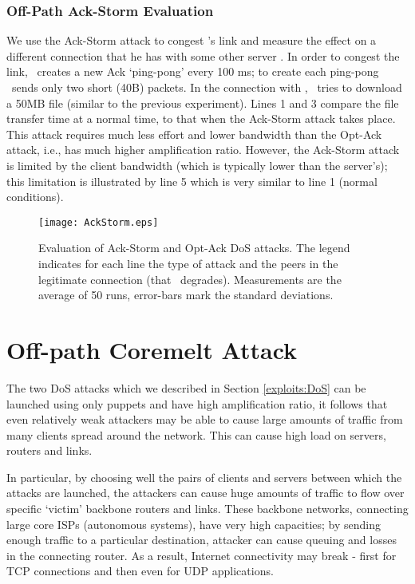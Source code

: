 \documentclass[conference]{IEEEtran}
\begin{document}
\subsubsection{Off-Path Ack-Storm Evaluation}
We use the Ack-Storm attack to congest \wini's link and measure the effect on a different connection that he has with some other server \lin*. In order to congest the link, \mal\ creates a new Ack `ping-pong' every 100 ms; to create each ping-pong \mal\ sends only two short (40B) packets. In the connection with \lin*, \wini\ tries to download a 50MB file (similar to the previous experiment). Lines 1 and 3 compare the file transfer time at a normal time, to that when the Ack-Storm attack takes place. This attack requires much less effort and lower bandwidth than the Opt-Ack attack, i.e., has much higher amplification ratio. However, the Ack-Storm attack is limited by the client bandwidth (which is typically lower than the server's); this limitation is illustrated by line 5 which is very similar to line 1 (normal conditions). 

\begin{figure}
    \texttt{[image: AckStorm.eps]}
  \caption{Evaluation of Ack-Storm and Opt-Ack DoS attacks. The legend indicates for each line the type of attack and the peers in the legitimate connection (that \mal\ degrades). Measurements are the average of 50 runs, error-bars mark the standard deviations.}
  \label{fig:AckStromOptAck}
\end{figure}







\section{Off-path Coremelt Attack} \label{coremelt}
The two DoS attacks which we described in Section \ref{exploits:DoS} can be launched using only puppets and have high amplification ratio, it follows that even relatively weak attackers may be able to cause large amounts of traffic from many clients spread around the network. This can cause high load on servers, routers and links. 

In particular, by choosing well the pairs of clients and servers between which the attacks are launched, the attackers can cause huge amounts of traffic to flow over specific `victim' backbone routers and links. These backbone networks, connecting large core ISPs (autonomous systems), have very high capacities; by sending enough traffic to a particular destination, attacker can cause queuing and losses in the connecting router. As a result, Internet connectivity may break - first for TCP connections and then even for UDP applications. 
\end{document}
